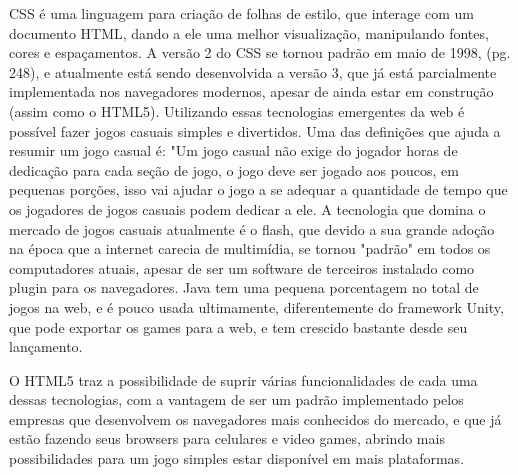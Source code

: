 CSS é uma linguagem para criação de folhas de estilo, que interage com um documento
HTML, dando a ele uma melhor visualização, manipulando fontes, cores e espaçamentos.
A versão 2 do CSS se tornou padrão em maio de 1998, \cite{zeldman2009designing} (pg. 248),
e atualmente está sendo desenvolvida a versão 3, que já está parcialmente implementada
nos navegadores modernos, apesar de ainda estar em construção (assim como o HTML5).
Utilizando essas tecnologias emergentes da web é possível fazer jogos casuais simples
e divertidos. Uma das definições que ajuda a resumir um jogo casual é: "Um jogo casual não exige do jogador horas de
dedicação para cada seção de jogo, o jogo deve ser jogado aos poucos, em pequenas
porções, isso vai ajudar o jogo a se adequar a quantidade de tempo que os jogadores
de jogos casuais podem dedicar a ele. \cite{trefry2010casual}
A tecnologia que domina o mercado de jogos casuais atualmente é o flash, que devido
a sua grande adoção na época que a internet carecia de multimídia, se tornou "padrão"
em todos os computadores atuais, apesar de ser um software de terceiros instalado
como plugin para os navegadores. Java tem uma pequena porcentagem no total de jogos
na web, e é pouco usada ultimamente, diferentemente do framework Unity, que pode exportar
os games para a web, e tem crescido bastante desde seu lançamento.

O HTML5 traz a possibilidade de suprir várias funcionalidades de cada uma dessas tecnologias,
com a vantagem de ser um padrão implementado pelos empresas que desenvolvem os navegadores
mais conhecidos do mercado, e que já estão fazendo seus browsers para celulares e
video games, abrindo mais possibilidades para um jogo simples estar disponível em mais plataformas.
